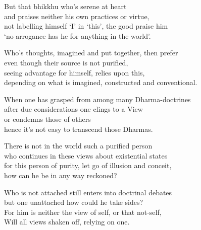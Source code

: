 \begin{MyDescription}{}
But that bhikkhu who's serene at heart\\
and praises neither his own practices or virtue,\\
not labelling himself `I' in `this', the good praise him\\
`no arrogance has he for anything in the world'.
\end{MyDescription}

\begin{MyDescription}{}
Who's thoughts, imagined and put together, then prefer\\
even though their source is not purified,\\
seeing advantage for himself, relies upon this,\\
depending on what is imagined, constructed and conventional.
\end{MyDescription}

\begin{MyDescription}{}
When one has grasped from among many Dharma-doctrines\\
after due considerations one clings to a View\\
or condemns those of others\\
hence it's not easy to transcend those Dharmas.
\end{MyDescription}

\begin{MyDescription}{}
There is not in the world such a purified person\\
who continues in these views about existential states\\
for this person of purity, let go of illusion and conceit,\\
how can he be in any way reckoned?
\end{MyDescription}

\begin{MyDescription}{}
Who is not attached still enters into doctrinal debates\\
but one unattached how could he take sides?\\
For him is neither the view of self, or that not-self,\\
Will all views shaken off, relying on one.
\end{MyDescription}


